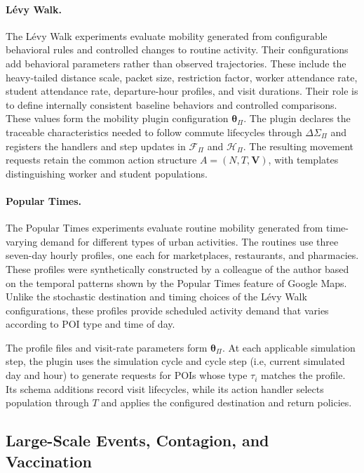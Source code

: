 \paragraph{L\'evy Walk.}
The L\'evy Walk experiments evaluate mobility generated from configurable behavioral rules and controlled changes to routine activity. Their configurations add behavioral parameters rather than observed trajectories. These include the heavy-tailed distance scale, packet size, restriction factor, worker attendance rate, student attendance rate, departure-hour profiles, and visit durations. Their role is to define internally consistent baseline behaviors and controlled comparisons. %
These values form the mobility plugin configuration $\bm{\theta}_{\Pi}$. The plugin declares the traceable characteristics needed to follow commute lifecycles through $\Delta\Sigma_{\Pi}$ and registers the handlers and step updates in $\mathcal{F}_{\Pi}$ and $\mathcal{H}_{\Pi}$. The resulting movement requests retain the common action structure $A=(N,T,\bm{V})$, with templates distinguishing worker and student populations.


\paragraph{Popular Times.}
The Popular Times experiments evaluate routine mobility generated from time-varying demand for different types of urban activities. The routines use three seven-day hourly profiles, one each for marketplaces, restaurants, and pharmacies. These profiles were synthetically constructed by a colleague of the author based on the temporal patterns shown by the Popular Times feature of Google Maps. Unlike the stochastic destination and timing choices of the L\'evy Walk configurations, these profiles provide scheduled activity demand that varies according to POI type and time of day.

The profile files and visit-rate parameters form $\bm{\theta}_{\Pi}$. At each applicable simulation step, the plugin uses the simulation cycle and cycle step (i.e, current simulated day and hour) to generate requests for POIs whose type $\tau_i$ matches the profile. Its schema additions record visit lifecycles, while its action handler selects population through $T$ and applies the configured destination and return policies.


\subsection{Large-Scale Events, Contagion, and Vaccination}

